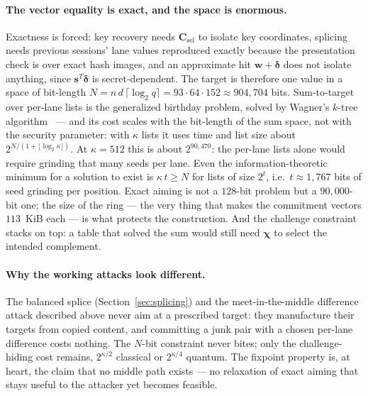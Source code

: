 \documentclass[11pt]{article}
\begin{document}
\paragraph{The vector equality is exact, and the space is enormous.}
Exactness is forced: key recovery needs $\mathbf C_{\mathrm{sel}}$ to isolate
key coordinates, splicing needs previous sessions' lane values reproduced
exactly because the presentation check is over exact hash images, and an
approximate hit $\mathbf w+\boldsymbol\delta$ does not isolate anything,
since $\mathbf s^{T}\boldsymbol\delta$ is secret-dependent.  The target is
therefore one value in a space of bit-length
$N=n\,d\,\lceil\log_2 q\rceil=93\cdot64\cdot152\approx 904{,}704$ bits.
Sum-to-target over per-lane lists is the generalized birthday problem, solved
by Wagner's $k$-tree algorithm~\cite{Wag02} --- and its cost scales with the
bit-length of the sum space, not with the security parameter: with $\kappa$
lists it uses time and list size about
$2^{N/(1+\lfloor\log_2\kappa\rfloor)}$.  At $\kappa=512$ this is about
$2^{90{,}470}$: the per-lane lists alone would require grinding that many
seeds per lane.  Even the information-theoretic minimum for a solution to
exist is $\kappa\,t\ge N$ for lists of size $2^t$, i.e.\ $t\approx1{,}767$
bits of seed grinding per position.  Exact aiming is not a $128$-bit problem
but a $90{,}000$-bit one; the size of the ring --- the very thing that makes
the commitment vectors $113$~KiB each --- is what protects the construction.
And the challenge constraint stacks on top: a table that solved the sum would
still need $\boldsymbol\chi$ to select the intended complement.

\paragraph{Why the working attacks look different.}
The balanced splice (Section~\ref{sec:splicing}) and the meet-in-the-middle
difference attack described above never aim at a prescribed target: they
manufacture their targets from copied content, and committing a junk pair
with a chosen per-lane difference costs nothing.  The $N$-bit constraint
never bites; only the challenge-hiding cost remains, $2^{\kappa/2}$ classical
or $2^{\kappa/4}$ quantum.  The fixpoint property is, at heart, the claim
that no middle path exists --- no relaxation of exact aiming that stays
useful to the attacker yet becomes feasible.
\end{document}
